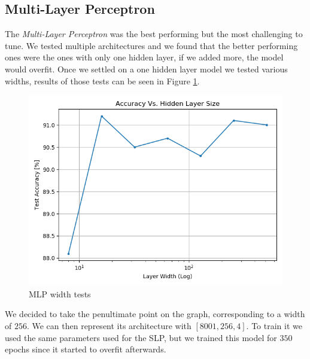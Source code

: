 \documentclass[10pt,a4paper]{report}
\begin{document}
\subsection{Multi-Layer Perceptron}
The \textit{Multi-Layer Perceptron} was the best performing but the most challenging to tune. We tested multiple architectures and we found that the better performing ones were the ones with only one hidden layer, if we added more, the model would overfit. Once we settled on a one hidden layer model we tested various widths, results of those tests can be seen in Figure \ref{fig:mlp_test}.
\begin{figure}[!ht]
\centering
\includegraphics[width=0.5\linewidth]{mlp_tests.png}
\caption{MLP width tests}
\label{fig:mlp_test}
\end{figure}
We decided to take the penultimate point on the graph, corresponding to a width of $256$. We can then represent its architecture with $[8001, 256, 4]$. To train it we used the same parameters used for the SLP, but we trained this model for $350$ epochs since it started to overfit afterwards. 
\end{document}
